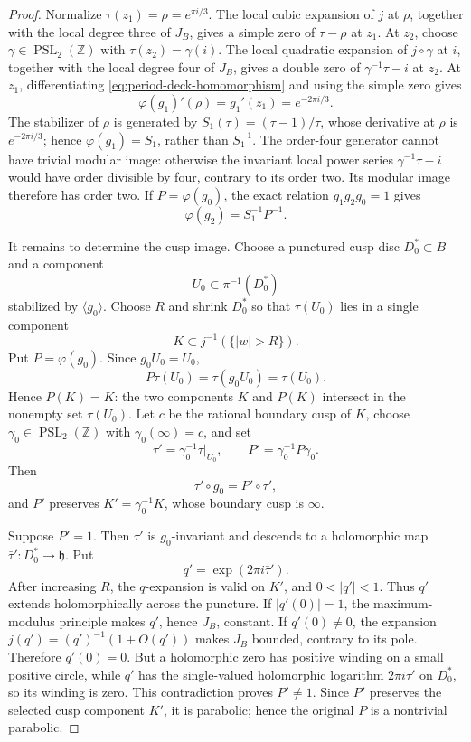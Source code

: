\begin{proof}
Normalize \(\tau(z_1)=\rho=e^{\pi i/3}\).  The local cubic expansion of
\(j\) at \(\rho\), together with the local degree three of \(J_B\), gives a
simple zero of \(\tau-\rho\) at \(z_1\).  At \(z_2\), choose
\(\gamma\in\operatorname{PSL}_2(\mathbb Z)\) with
\(\tau(z_2)=\gamma(i)\).  The local quadratic expansion of
\(j\circ\gamma\) at \(i\), together with the local degree four of \(J_B\),
 gives a double zero of \(\gamma^{-1}\tau-i\) at \(z_2\).  At \(z_1\),
 differentiating \cref{eq:period-deck-homomorphism} and using the simple
 zero gives
 \[
  \varphi(g_1)'(\rho)=g_1'(z_1)=e^{-2\pi i/3}.
 \]
 The stabilizer of \(\rho\) is generated by
 \(S_1(\tau)=(\tau-1)/\tau\), whose derivative at \(\rho\) is
 \(e^{-2\pi i/3}\); hence \(\varphi(g_1)=S_1\), rather than \(S_1^{-1}\).
 The order-four generator cannot have trivial modular image:
otherwise the invariant local power series \(\gamma^{-1}\tau-i\) would have
order divisible by four, contrary to its order two.  Its modular image
 therefore has order two.  If \(P=\varphi(g_0)\), the exact relation
 \(g_1g_2g_0=1\) gives
 \begin{equation}
  \varphi(g_2)=S_1^{-1}P^{-1}.
 \label{eq:period-second-generator-from-cusp}
 \end{equation}

It remains to determine the cusp image.  Choose a punctured cusp disc
\(D_0^*\subset B\) and a component
\[
 U_0\subset\pi^{-1}(D_0^*)
\]
stabilized by \(\langle g_0\rangle\).  Choose \(R\) and shrink \(D_0^*\) so
that \(\tau(U_0)\) lies in a single component
\[
 K\subset j^{-1}(\{|w|>R\}).
\]
Put \(P=\varphi(g_0)\).  Since \(g_0U_0=U_0\),
\[
 P\tau(U_0)=\tau(g_0U_0)=\tau(U_0).
\]
Hence \(P(K)=K\): the two components \(K\) and \(P(K)\) intersect in the
nonempty set \(\tau(U_0)\).  Let \(c\) be the rational boundary cusp of
\(K\), choose
\(\gamma_0\in\operatorname{PSL}_2(\mathbb Z)\) with
\(\gamma_0(\infty)=c\), and set
\[
 \tau'=\gamma_0^{-1}\tau|_{U_0},\qquad
 P'=\gamma_0^{-1}P\gamma_0.
\]
Then
\[
 \tau'\circ g_0=P'\circ\tau',
\]
and \(P'\) preserves \(K'=\gamma_0^{-1}K\), whose boundary cusp is
\(\infty\).

Suppose \(P'=1\).  Then \(\tau'\) is \(g_0\)-invariant and descends to a
holomorphic map \(\bar\tau':D_0^*\to\mathfrak h\).  Put
\[
 q'=\exp(2\pi i\bar\tau').
\]
After increasing \(R\), the \(q\)-expansion is valid on \(K'\), and
\(0<|q'|<1\).  Thus \(q'\) extends holomorphically across the puncture.
If \(|q'(0)|=1\), the maximum-modulus principle makes \(q'\), hence
\(J_B\), constant.  If \(q'(0)\ne0\), the expansion
\(j(q')=(q')^{-1}(1+O(q'))\) makes \(J_B\) bounded, contrary to its pole.
Therefore \(q'(0)=0\).  But a holomorphic zero has positive winding on a
small positive circle, while \(q'\) has the single-valued holomorphic
logarithm \(2\pi i\bar\tau'\) on \(D_0^*\), so its winding is zero.  This
contradiction proves \(P'\ne1\).  Since \(P'\) preserves the selected cusp
component \(K'\), it is parabolic; hence the original \(P\) is a nontrivial
parabolic.


\end{proof}
